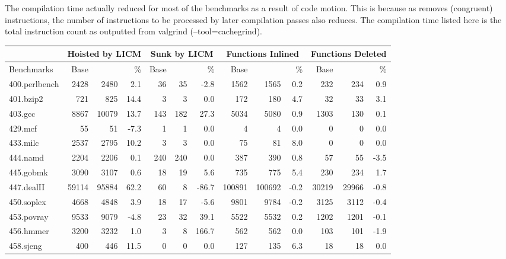 \documentclass[acmlarge,review,anonymous]{acmart}\settopmatter{printfolios=true}
\begin{document}
The compilation time actually reduced for most of the benchmarks as a result of code motion.
This is because as \gcm{} removes (congruent) instructions, the number of instructions
to be processed by later compilation passes also reduces. The compilation time listed here
is the total instruction count as outputted from valgrind (--tool=cachegrind).


\begin{table}[h!]
  \begin{center}
    \begin{tabular}{|l|r|r|r|r|r|r|r|r|r|r|r|r|}
      \hline
  &  \multicolumn{3}{|c|}{Hoisted by LICM} &\multicolumn{3}{|c|}{Sunk by LICM} &\multicolumn{3}{|c|}{Functions Inlined} &  \multicolumn{3}{|c|}{Functions Deleted} \\\hline
 Benchmarks       & Base        & \GCM{}	& \%  &Base     & \GCM{}   &\%    & Base	& \GCM{}	  &\%   & Base	& \GCM{}	& \% \\\hline
 400.perlbench	  & 2428	& 2480	& 2.1 & 36	& 35	& -2.8 & 1562	& 1565	  & 0.2 & 232	& 234	& 0.9  \\\hline
 401.bzip2	  & 721	        & 825	& 14.4& 3	& 3	& 0.0  & 172	& 180	  & 4.7 & 32	& 33	& 3.1  \\\hline
 403.gcc	  & 8867	& 10079	& 13.7& 143	& 182	& 27.3 & 5034	& 5080	  & 0.9 & 1303	& 130	& 0.1  \\\hline
 429.mcf	  & 55	        & 51	& -7.3& 1	& 1	& 0.0  & 4	& 4	  & 0.0 & 0 	& 0	& 0.0  \\\hline
 433.milc	  & 2537	& 2795	& 10.2& 3	& 3	& 0.0  & 75	& 81	  & 8.0 & 0	& 0	& 0.0  \\\hline
 444.namd	  & 2204	& 2206	& 0.1 & 240	& 240	& 0.0  & 387	& 390	  & 0.8 & 57	& 55	& -3.5 \\\hline
 445.gobmk	  & 3090	& 3107	& 0.6 & 18	& 19	& 5.6  & 735	& 775	  & 5.4 & 230	& 234	& 1.7  \\\hline
 447.dealII	  & 59114	& 95884	& 62.2& 60	& 8	& -86.7& 100891& 100692  & -0.2& 30219	& 29966	& -0.8 \\\hline
 450.soplex	  & 4668	& 4848	& 3.9 & 18	& 17	& -5.6 & 9801	& 9784	  & -0.2& 3125	& 3112	& -0.4 \\\hline
 453.povray	  & 9533	& 9079	& -4.8& 23	& 32	& 39.1 & 5522	& 5532	  & 0.2 & 1202	& 1201	& -0.1 \\\hline
 456.hmmer	  & 3200	& 3232	& 1.0 & 3	& 8	& 166.7& 562	& 562	  & 0.0 & 103	& 101	& -1.9 \\\hline
 458.sjeng	  & 400	        & 446	& 11.5& 0	& 0	& 0.0  & 127	& 135	  & 6.3 & 18	& 18	& 0.0  \\\hline

\end{tabular}
\end{center}
\end{table}
\end{document}
